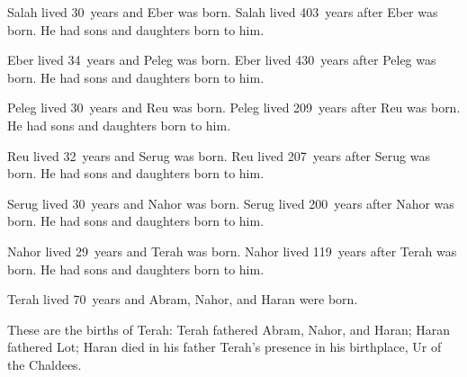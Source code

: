 \begin{inparaenum}
     Salah lived 30~years and Eber was born.%
     Salah lived 403~years after Eber was born. He had sons and daughters born to him.%
    
     Eber lived 34~years and Peleg was born.%
     Eber lived 430~years after Peleg was born. He had sons and daughters born to him.%
    
     Peleg lived 30~years and Reu was born.%
     Peleg lived 209~years after Reu was born. He had sons and daughters born to him.%
    
     Reu lived 32~years and Serug was born.%
     Reu lived 207~years after Serug was born. He had sons and daughters born to him.%
    
     Serug lived 30~years and Nahor was born.%
     Serug lived 200~years after Nahor was born. He had sons and daughters born to him.%
    
     Nahor lived 29~years and Terah was born.%
     Nahor lived 119~years after Terah was born. He had sons and daughters born to him.%
    
     Terah lived 70~years and Abram, Nahor, and Haran were born.%
    
     These are the births of Terah: Terah fathered Abram, Nahor, and Haran; Haran fathered Lot;%
     Haran died in his father Terah's presence in his birthplace, Ur of the Chaldees.%
\end{inparaenum}
